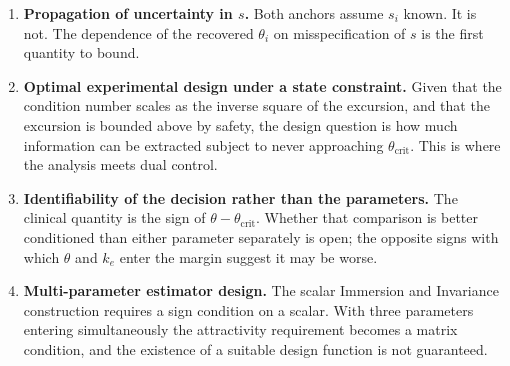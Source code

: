 \documentclass[11pt,a4paper]{article}
\newcommand{\thc}{\theta_{\mathrm{crit}}}
\begin{document}
\begin{enumerate}[leftmargin=*, itemsep=3pt]
\item \textbf{Propagation of uncertainty in $s$.} Both anchors assume $s_i$ known. It is
      not. The dependence of the recovered $\theta_i$ on misspecification of $s$ is the
      first quantity to bound.

\item \textbf{Optimal experimental design under a state constraint.} Given that the
      condition number scales as the inverse square of the excursion, and that the excursion
      is bounded above by safety, the design question is how much information can be
      extracted subject to never approaching $\thc$. This is where the analysis meets
      dual control.

\item \textbf{Identifiability of the decision rather than the parameters.} The clinical
      quantity is the sign of $\theta - \thc$. Whether that comparison is better conditioned
      than either parameter separately is open; the opposite signs with which $\theta$ and
      $k_e$ enter the margin suggest it may be worse.

\item \textbf{Multi-parameter estimator design.} The scalar Immersion and Invariance
      construction requires a sign condition on a scalar. With three parameters entering
      simultaneously the attractivity requirement becomes a matrix condition, and the
      existence of a suitable design function is not guaranteed.
\end{enumerate}
\end{document}
